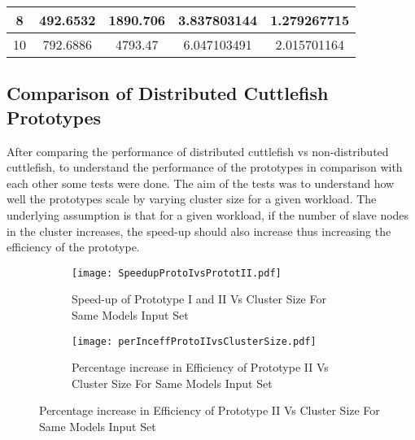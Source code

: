 \begin{table}
\begin{tabular}{|c|c|c|c|c|}
8                                                                                                                            & 492.6532                                                                                                                                              & 1890.706                                                                                                              & 3.837803144       & 1.279267715                 \\ \hline
10                                                                                                                           & 792.6886                                                                                                                                              & 4793.47                                                                                                               & 6.047103491       & 2.015701164                 \\ \hline
\end{tabular}
\end{table}



\subsection{Comparison of Distributed Cuttlefish Prototypes} \label{ProtoComp}

After comparing the performance of distributed cuttlefish vs non-distributed cuttlefish, to understand the performance of the prototypes in comparison with each other some tests were done. The aim of the tests was to understand how well the prototypes scale by varying cluster size for a given workload. The underlying assumption is that for a given workload, if the number of slave nodes in the cluster increases, the speed-up should also increase thus increasing the efficiency of the prototype. 

\begin{figure}
\centering
\captionsetup[subfigure]{labelformat=empty}
\begin{subfigure}
\centering
\texttt{[image: SpeedupProtoIvsPrototII.pdf]}
\caption{Speed-up of Prototype I and II Vs Cluster Size For Same Models Input Set}
\label{fig:SUPIPII}
\end{subfigure}
\begin{subfigure}
\centering
\texttt{[image: perInceffProtoIIvsClusterSize.pdf]}
\caption{ Percentage increase in Efficiency of Prototype II Vs Cluster Size For Same Models Input Set}
\label{fig:perInceffProtoIIvsCS}
\end{subfigure}
\end{figure}

